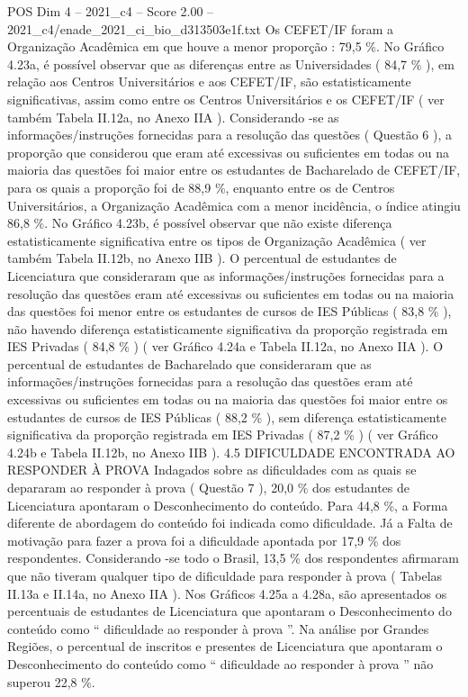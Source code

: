 \begin{textsample}{POS Dim 4 – 2021\_c4 – Score 2.00 – 2021\_c4/enade\_2021\_ci\_bio\_d313503e1f.txt}
Os CEFET/IF foram a Organização Acadêmica em que houve a menor proporção : 79,5 \%.
No Gráfico 4.23a, é possível observar que as diferenças entre as Universidades ( 84,7 \% ), em relação aos Centros Universitários e aos CEFET/IF, são estatisticamente significativas, assim como entre os Centros Universitários e os CEFET/IF ( ver também Tabela II.12a, no Anexo IIA ).
Considerando -se as informações/instruções fornecidas para a resolução das questões ( Questão 6 ), a proporção que considerou que eram até excessivas ou suficientes em todas ou na maioria das questões foi maior entre os estudantes de Bacharelado de CEFET/IF, para os quais a proporção foi de 88,9 \%, enquanto entre os de Centros Universitários, a Organização Acadêmica com a menor incidência, o índice atingiu 86,8 \%.
No Gráfico 4.23b, é possível observar que não existe diferença estatisticamente significativa entre os tipos de Organização Acadêmica ( ver também Tabela II.12b, no Anexo IIB ).
O percentual de estudantes de Licenciatura que consideraram que as informações/instruções fornecidas para a resolução das questões eram até excessivas ou suficientes em todas ou na maioria das questões foi menor entre os estudantes de cursos de IES Públicas ( 83,8 \% ), não havendo diferença estatisticamente significativa da proporção registrada em IES Privadas ( 84,8 \% ) ( ver Gráfico 4.24a e Tabela II.12a, no Anexo IIA ).
O percentual de estudantes de Bacharelado que consideraram que as informações/instruções fornecidas para a resolução das questões eram até excessivas ou suficientes em todas ou na maioria das questões foi maior entre os estudantes de cursos de IES Públicas ( 88,2 \% ), sem diferença estatisticamente significativa da proporção registrada em IES Privadas ( 87,2 \% ) ( ver Gráfico 4.24b e Tabela II.12b, no Anexo IIB ). 4.5 DIFICULDADE ENCONTRADA AO RESPONDER À PROVA Indagados sobre as dificuldades com as quais se depararam ao responder à prova ( Questão 7 ), 20,0 \% dos estudantes de Licenciatura apontaram o Desconhecimento do conteúdo.
Para 44,8 \%, a Forma diferente de abordagem do conteúdo foi indicada como dificuldade.
Já a Falta de motivação para fazer a prova foi a dificuldade apontada por 17,9 \% dos respondentes.
Considerando -se todo o Brasil, 13,5 \% dos respondentes afirmaram que não tiveram qualquer tipo de dificuldade para responder à prova ( Tabelas II.13a e II.14a, no Anexo IIA ).
Nos Gráficos 4.25a a 4.28a, são apresentados os percentuais de estudantes de Licenciatura que apontaram o Desconhecimento do conteúdo como “ dificuldade ao responder à prova ”.
Na análise por Grandes Regiões, o percentual de inscritos e presentes de Licenciatura que apontaram o Desconhecimento do conteúdo como “ dificuldade ao responder à prova ” não superou 22,8 \%.

\end{textsample}
